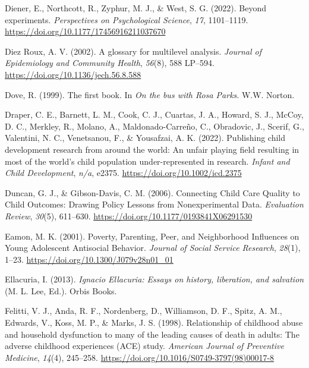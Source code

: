 \documentclass[
  letterpaper,
  DIV=11,
  numbers=noendperiod]{scrreprt}
\newlength{\cslhangindent}
\newenvironment{CSLReferences}[2] %
 {\begin{list}{}{%
  \setlength{\itemindent}{0pt}
  \setlength{\leftmargin}{0pt}
  \setlength{\parsep}{0pt}
  \ifodd #1
   \setlength{\leftmargin}{\cslhangindent}
   \setlength{\itemindent}{-1\cslhangindent}
  \fi
  \setlength{\itemsep}{#2\baselineskip}}}
 {\end{list}}
\begin{document}
\begin{CSLReferences}{1}{0}
Diener, E., Northcott, R., Zyphur, M. J., \& West, S. G. (2022). Beyond
experiments. \emph{Perspectives on Psychological Science}, \emph{17},
1101--1119. \url{https://doi.org/10.1177/17456916211037670}

Diez Roux, A. V. (2002). {A glossary for multilevel analysis}.
\emph{Journal of Epidemiology and Community Health}, \emph{56}(8), 588
LP--594. \url{https://doi.org/10.1136/jech.56.8.588}

Dove, R. (1999). The first book. In \emph{On the bus with {R}osa
{P}arks}. W.W. Norton.

Draper, C. E., Barnett, L. M., Cook, C. J., Cuartas, J. A., Howard, S.
J., McCoy, D. C., Merkley, R., Molano, A., Maldonado-Carreño, C.,
Obradovic, J., Scerif, G., Valentini, N. C., Venetsanou, F., \&
Yousafzai, A. K. (2022). Publishing child development research from
around the world: An unfair playing field resulting in most of the
world's child population under-represented in research. \emph{Infant and
Child Development}, \emph{n/a}, e2375.
\url{https://doi.org/10.1002/icd.2375}

Duncan, G. J., \& Gibson-Davis, C. M. (2006). {Connecting Child Care
Quality to Child Outcomes: Drawing Policy Lessons from Nonexperimental
Data}. \emph{Evaluation Review}, \emph{30}(5), 611--630.
\url{https://doi.org/10.1177/0193841X06291530}

Eamon, M. K. (2001). {Poverty, Parenting, Peer, and Neighborhood
Influences on Young Adolescent Antisocial Behavior}. \emph{Journal of
Social Service Research}, \emph{28}(1), 1--23.
\url{https://doi.org/10.1300/J079v28n01_01}

Ellacuria, I. (2013). \emph{{I}gnacio {E}llacuria: Essays on history,
liberation, and salvation} (M. L. Lee, Ed.). Orbis Books.

Felitti, V. J., Anda, R. F., Nordenberg, D., Williamson, D. F., Spitz,
A. M., Edwards, V., Koss, M. P., \& Marks, J. S. (1998). Relationship of
childhood abuse and household dysfunction to many of the leading causes
of death in adults: The adverse childhood experiences (ACE) study.
\emph{American Journal of Preventive Medicine}, \emph{14}(4), 245--258.
\url{https://doi.org/10.1016/S0749-3797(98)00017-8}


\end{CSLReferences}
\end{document}
